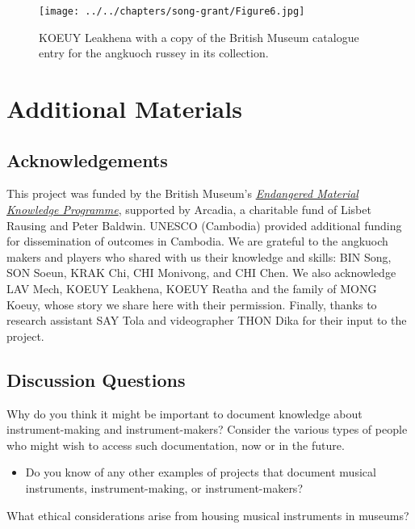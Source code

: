 \documentclass[twoside]{article}
\begin{document}
\begin{figure}
  \texttt{[image: ../../chapters/song-grant/Figure6.jpg]}
  \caption{KOEUY Leakhena with a copy
  of the British Museum catalogue entry for the angkuoch russey in its
  collection.}
\end{figure}

\hypertarget{additional-materials}{%
\section*{Additional Materials}\label{additional-materials}}

\hypertarget{acknowledgements}{%
\subsection*{Acknowledgements}\label{acknowledgements}}

This project was funded by the British Museum's
\href{https://www.emkp.org/documentingcambodianmouthharp/}{\emph{Endangered
Material Knowledge Programme}}, supported by Arcadia, a charitable fund
of Lisbet Rausing and Peter Baldwin. UNESCO (Cambodia) provided
additional funding for dissemination of outcomes in Cambodia. We are
grateful to the angkuoch makers and players who shared with us their
knowledge and skills: BIN Song, SON Soeun, KRAK Chi, CHI Monivong, and
CHI Chen. We also acknowledge LAV Mech, KOEUY Leakhena, KOEUY Reatha and
the family of MONG Koeuy, whose story we share here with their
permission. Finally, thanks to research assistant SAY Tola and
videographer THON Dika for their input to the project.

\hypertarget{discussion-questions}{%
\subsection*{Discussion Questions}\label{discussion-questions}}

Why do you think it might be important to document knowledge about
instrument-making and instrument-makers? Consider the various types of
people who might wish to access such documentation, now or in the
future.

\begin{itemize}
\item
  Do you know of any other examples of projects that document musical
  instruments, instrument-making, or instrument-makers?
\end{itemize}

What ethical considerations arise from housing musical instruments in
museums?
\end{document}
